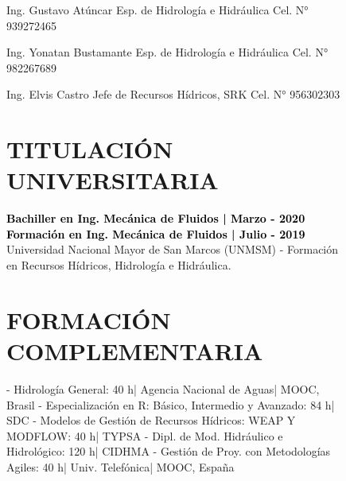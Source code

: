 \documentclass[
  10pt,
]{article}
\begin{document}
\begin{figure}[tph]
\begin{minipage}[t]{0.3\textwidth}
\raggedright
{Ing. Gustavo Atúncar\vfill\vspace{-3mm}}
{Esp. de Hidrología e Hidráulica\vfill\vspace{-3mm}}
{Cel. N° 939272465\vfill\vspace{0mm}}

{Ing. Yonatan Bustamante\vfill\vspace{-3mm}}
{Esp. de Hidrología e Hidráulica\vfill\vspace{-3mm}}
{Cel. N° 982267689\vfill\vspace{0mm}}

{Ing. Elvis Castro\vfill\vspace{-3mm}}
{Jefe de Recursos Hídricos, SRK\vfill\vspace{-3mm}}
{Cel. N° 956302303\vfill\vspace{0mm}}


\vspace{1mm}

  \end{minipage}
  \hfill
  \begin{minipage}[t]{0.65\textwidth}
  \justify
  \vspace*{-6\baselineskip}

\section{TITULACIÓN UNIVERSITARIA\vspace{-0.35em}}

\textcolor{black}{\textbf{Bachiller en Ing. Mecánica de Fluidos | Marzo - 2020}}
\vspace{1.3mm}\vfill
\textcolor{black}{\textbf{Formación en Ing. Mecánica de Fluidos | Julio - 2019}}
\vspace{1.3mm}\vfill
Universidad Nacional Mayor de San Marcos (UNMSM)
\vspace{0.6mm}\vfill
- Formación en Recursos Hídricos, Hidrología e Hidráulica.
\vspace{0.6mm}\vfill

\section{FORMACIÓN COMPLEMENTARIA\vspace{-0.35em}}

- Hidrología General: 40 h| Agencia Nacional de Aguas| MOOC, Brasil\vspace{0.7mm}\vfill
- Especialización en R: Básico, Intermedio y Avanzado: 84 h| SDC\vspace{0.7mm}\vfill
- Modelos de Gestión de Recursos Hídricos: WEAP Y MODFLOW: 40 h| TYPSA\vspace{0.7mm}\vfill
- Dipl. de Mod. Hidráulico e Hidrológico: 120 h| CIDHMA\vspace{0.7mm}\vfill
- Gestión de Proy. con Metodologías Agiles: 40 h| Univ. Telefónica| MOOC, España\vspace{0.7mm}


\end{minipage}
\end{figure}
\end{document}
